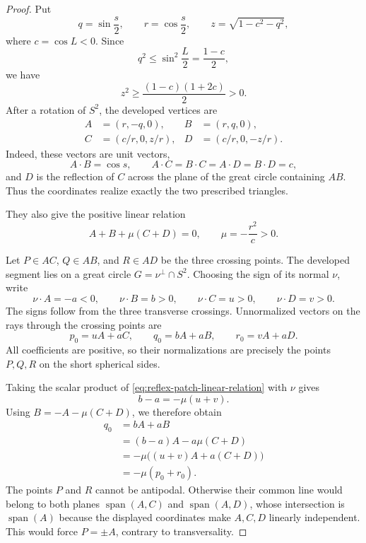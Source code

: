 \documentclass[12pt,a4paper]{article}
\theoremstyle{definition}
\begin{document}
\begin{proof}
Put
\[
 q=\sin\frac{s}{2},\qquad r=\cos\frac{s}{2},\qquad
 z=\sqrt{1-c^2-q^2},
\]
where \(c=\cos L<0\).  Since
\[
 q^2\le\sin^2\frac L2=\frac{1-c}{2},
\]
we have
\[
 z^2\ge\frac{(1-c)(1+2c)}2>0.
\]
After a rotation of \(S^2\), the developed vertices are
\[
 \begin{aligned}
 A&=(r,-q,0),& B&=(r,q,0),\\
 C&=(c/r,0,z/r),&D&=(c/r,0,-z/r).
 \end{aligned}
\]
Indeed, these vectors are unit vectors,
\[
 A\cdot B=\cos s,
 \qquad
 A\cdot C=B\cdot C=A\cdot D=B\cdot D=c,
\]
and \(D\) is the reflection of \(C\) across the plane of the great circle
containing \(AB\).  Thus the coordinates realize exactly the two prescribed
triangles.

They also give the positive linear relation
\begin{equation}\label{eq:reflex-patch-linear-relation}
        A+B+\mu(C+D)=0,
        \qquad
        \mu=-\frac{r^2}{c}>0 .
\end{equation}

Let \(P\in AC\), \(Q\in AB\), and \(R\in AD\) be the three crossing points.
The developed segment lies on a great circle
\(G=\nu^\perp\cap S^2\).  Choosing the sign of its normal \(\nu\), write
\[
 \nu\cdot A=-a<0,\qquad
 \nu\cdot B=b>0,\qquad
 \nu\cdot C=u>0,\qquad
 \nu\cdot D=v>0.
\]
The signs follow from the three transverse crossings.  Unnormalized vectors
on the rays through the crossing points are
\[
 p_0=uA+aC,\qquad
 q_0=bA+aB,\qquad
 r_0=vA+aD.
\]
All coefficients are positive, so their normalizations are precisely the
points \(P,Q,R\) on the short spherical sides.

Taking the scalar product of
\eqref{eq:reflex-patch-linear-relation} with \(\nu\) gives
\[
        b-a=-\mu(u+v).
\]
Using \(B=-A-\mu(C+D)\), we therefore obtain
\[
 \begin{aligned}
 q_0
 &=bA+aB\\
 &=(b-a)A-a\mu(C+D)\\
 &=-\mu\bigl((u+v)A+a(C+D)\bigr)\\
 &=-\mu(p_0+r_0).
 \end{aligned}
\]
The points \(P\) and \(R\) cannot be antipodal.  Otherwise their common line
would belong to both planes \(\operatorname{span}(A,C)\) and
\(\operatorname{span}(A,D)\), whose intersection is
\(\operatorname{span}(A)\) because the displayed coordinates make
\(A,C,D\) linearly independent.  This would force \(P=\pm A\), contrary to
transversality.


\end{proof}
\end{document}
